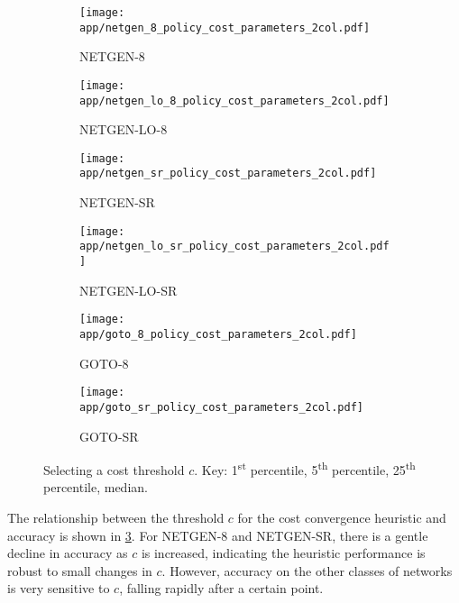 \begin{figure}
    \begin{widepage}
        \begin{subfigure}[c]{0.5\textwidth}
            \texttt{[image: app/netgen\_8\_policy\_cost\_parameters\_2col.pdf]}
            \caption{NETGEN-8}
        \end{subfigure}
        \begin{subfigure}[c]{0.5\textwidth}
            \texttt{[image: app/netgen\_lo\_8\_policy\_cost\_parameters\_2col.pdf]}
            \caption{NETGEN-LO-8}
            \label{fig:app-general-cost-parameters:netgen-lo-8}
        \end{subfigure}
        \begin{subfigure}[c]{0.5\textwidth}
            \texttt{[image: app/netgen\_sr\_policy\_cost\_parameters\_2col.pdf]}
            \caption{NETGEN-SR}
        \end{subfigure}
        \begin{subfigure}[c]{0.5\textwidth}
            \texttt{[image: app/netgen\_lo\_sr\_policy\_cost\_parameters\_2col.pdf]}
            \caption{NETGEN-LO-SR}
            \label{fig:app-general-cost-parameters:netgen-lo-sr}
        \end{subfigure}
        \begin{subfigure}[c]{0.5\textwidth}
            \texttt{[image: app/goto\_8\_policy\_cost\_parameters\_2col.pdf]}
            \caption{GOTO-8}
        \end{subfigure}
        \begin{subfigure}[c]{0.5\textwidth}
            \texttt{[image: app/goto\_sr\_policy\_cost\_parameters\_2col.pdf]}
            \caption{GOTO-SR}
        \end{subfigure}
    \end{widepage}
    \caption{Selecting a cost threshold $c$. Key: {\color{matplotlib_blue} 1\textsuperscript{st} percentile}, {\color{matplotlib_green} 5\textsuperscript{th} percentile}, {\color{matplotlib_red} 25\textsuperscript{th} percentile}, {\color{matplotlib_cyan} median}.}
    \label{fig:app-general-cost-parameters}
\end{figure}

The relationship between the threshold $c$ for the cost convergence heuristic and accuracy is shown in \cref{fig:app-general-cost-parameters}. For NETGEN-8 and NETGEN-SR, there is a gentle decline in accuracy as $c$ is increased, indicating the heuristic performance is robust to small changes in $c$. However, accuracy on the other classes of networks is very sensitive to $c$, falling rapidly after a certain point.

